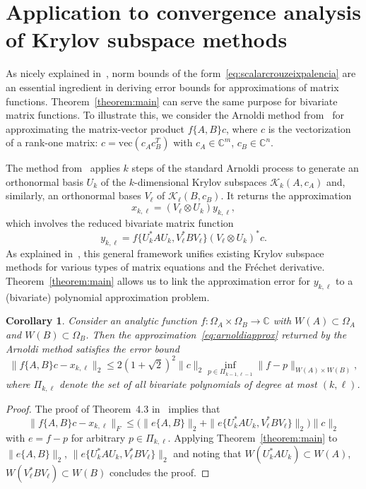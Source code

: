 \documentclass[11pt,a4paper]{amsart}
\newtheorem{corollary}[theorem]{Corollary}
\newcommand{\C}{{\mathbb C}}
\newcommand{\calK}{{\mathcal K}}
\begin{document}
\section{Application to convergence analysis of Krylov subspace methods} \label{sec:krylov}

As nicely explained in~\cite{BadeaBeckermann2013}, norm bounds of the form~\eqref{eq:scalarcrouzeixpalencia} are an essential ingredient in deriving error bounds for approximations of matrix functions. Theorem~\ref{theorem:main} can serve the same purpose for bivariate matrix functions. To illustrate this, we consider the Arnoldi method from~\cite{Kressner2019bivariate} for approximating the matrix-vector product $f\{A,B\}c$, where $c$ is the vectorization of a rank-one matrix: $c = \text{vec}(c_A c_B^T)$ with $c_A \in \C^m$, $c_B \in \C^n$.

The method from~\cite{Kressner2019bivariate} applies $k$ steps of the standard Arnoldi process to generate an orthonormal basis $U_k$ of the 
$k$-dimensional Krylov subspaces $\calK_k(A,c_A)$ and, similarly, an 
orthonormal bases $V_\ell$ of 
$\calK_\ell(B,c_B)$. It returns the approximation 
\begin{equation} \label{eq:arnoldiapprox}
 x_{k,\ell} = ( V_\ell \otimes U_k) y_{k,\ell},
\end{equation}
which involves the reduced bivariate matrix function
\[
 y_{k,\ell} = f\big\{U_k^\ast A U_k ,V_\ell^\ast B V_\ell \big\}
 ( V_\ell \otimes U_k)^\ast c.
\]
As explained in~\cite{Kressner2019bivariate}, this general framework unifies existing Krylov subspace methods for various types of matrix equations and the Fr\'echet derivative. Theorem~\ref{theorem:main} allows us to link the approximation error for $y_{k,\ell}$ to a (bivariate) polynomial approximation problem.
\begin{corollary} \label{theorem:convergence}
Consider an analytic function $f:\Omega_A\times\Omega_B\to \C$
with $W(A) \subset \Omega_A$ and $W(B) \subset \Omega_B$. Then the approximation~\eqref{eq:arnoldiapprox} returned by the Arnoldi method satisfies
the error bound
\[
 \|f\{A,B\} c  - x_{k,\ell} \|_2 \le 2 (1+\sqrt{2})^2 \|c\|_2 \inf_{p \in \Pi_{k-1,\ell-1}} \| f-p \|_{W(A)\times W(B)},
\]
where $\Pi_{k,\ell}$ denote the set of all bivariate polynomials of degree at most $(k,\ell)$.
\end{corollary}
\begin{proof}
The proof of Theorem~4.3 in~\cite{Kressner2019bivariate} implies that
\[
 \|f\{A,B\} c  - x_{k,\ell} \|_F \le \big( \| e\{A,B \} \|_2 + \| e\{ U_k^\ast A U_k ,V_\ell^\ast B V_\ell \}\|_2  \big) \|c\|_2
 \]
 with $e = f-p$ for arbitrary $p \in \Pi_{k,\ell}$.
 Applying Theorem~\ref{theorem:main} to 
 $\| e\{A,B \} \|_2$, $\| e\{ U_k^\ast A U_k ,V_\ell^\ast B V_\ell \}\|_2$ and noting that
 $W(U_k^\ast A U_k) \subset W(A)$, $W(V_\ell^\ast B V_\ell) \subset W(B)$ concludes the proof.
\end{proof}




%

%



 
\end{document}
